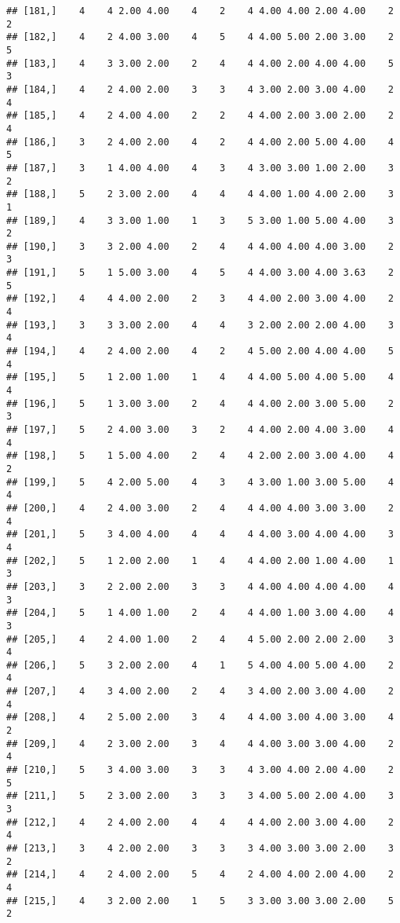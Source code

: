 \documentclass[]{article}
\begin{document}
\begin{verbatim}
## [181,]    4    4 2.00 4.00    4    2    4 4.00 4.00 2.00 4.00    2    2
## [182,]    4    2 4.00 3.00    4    5    4 4.00 5.00 2.00 3.00    2    5
## [183,]    4    3 3.00 2.00    2    4    4 4.00 2.00 4.00 4.00    5    3
## [184,]    4    2 4.00 2.00    3    3    4 3.00 2.00 3.00 4.00    2    4
## [185,]    4    2 4.00 4.00    2    2    4 4.00 2.00 3.00 2.00    2    4
## [186,]    3    2 4.00 2.00    4    2    4 4.00 2.00 5.00 4.00    4    5
## [187,]    3    1 4.00 4.00    4    3    4 3.00 3.00 1.00 2.00    3    2
## [188,]    5    2 3.00 2.00    4    4    4 4.00 1.00 4.00 2.00    3    1
## [189,]    4    3 3.00 1.00    1    3    5 3.00 1.00 5.00 4.00    3    2
## [190,]    3    3 2.00 4.00    2    4    4 4.00 4.00 4.00 3.00    2    3
## [191,]    5    1 5.00 3.00    4    5    4 4.00 3.00 4.00 3.63    2    5
## [192,]    4    4 4.00 2.00    2    3    4 4.00 2.00 3.00 4.00    2    4
## [193,]    3    3 3.00 2.00    4    4    3 2.00 2.00 2.00 4.00    3    4
## [194,]    4    2 4.00 2.00    4    2    4 5.00 2.00 4.00 4.00    5    4
## [195,]    5    1 2.00 1.00    1    4    4 4.00 5.00 4.00 5.00    4    4
## [196,]    5    1 3.00 3.00    2    4    4 4.00 2.00 3.00 5.00    2    3
## [197,]    5    2 4.00 3.00    3    2    4 4.00 2.00 4.00 3.00    4    4
## [198,]    5    1 5.00 4.00    2    4    4 2.00 2.00 3.00 4.00    4    2
## [199,]    5    4 2.00 5.00    4    3    4 3.00 1.00 3.00 5.00    4    4
## [200,]    4    2 4.00 3.00    2    4    4 4.00 4.00 3.00 3.00    2    4
## [201,]    5    3 4.00 4.00    4    4    4 4.00 3.00 4.00 4.00    3    4
## [202,]    5    1 2.00 2.00    1    4    4 4.00 2.00 1.00 4.00    1    3
## [203,]    3    2 2.00 2.00    3    3    4 4.00 4.00 4.00 4.00    4    3
## [204,]    5    1 4.00 1.00    2    4    4 4.00 1.00 3.00 4.00    4    3
## [205,]    4    2 4.00 1.00    2    4    4 5.00 2.00 2.00 2.00    3    4
## [206,]    5    3 2.00 2.00    4    1    5 4.00 4.00 5.00 4.00    2    4
## [207,]    4    3 4.00 2.00    2    4    3 4.00 2.00 3.00 4.00    2    4
## [208,]    4    2 5.00 2.00    3    4    4 4.00 3.00 4.00 3.00    4    2
## [209,]    4    2 3.00 2.00    3    4    4 4.00 3.00 3.00 4.00    2    4
## [210,]    5    3 4.00 3.00    3    3    4 3.00 4.00 2.00 4.00    2    5
## [211,]    5    2 3.00 2.00    3    3    3 4.00 5.00 2.00 4.00    3    3
## [212,]    4    2 4.00 2.00    4    4    4 4.00 2.00 3.00 4.00    2    4
## [213,]    3    4 2.00 2.00    3    3    3 4.00 3.00 3.00 2.00    3    2
## [214,]    4    2 4.00 2.00    5    4    2 4.00 4.00 2.00 4.00    2    4
## [215,]    4    3 2.00 2.00    1    5    3 3.00 3.00 3.00 2.00    5    2

\end{verbatim}
\end{document}
